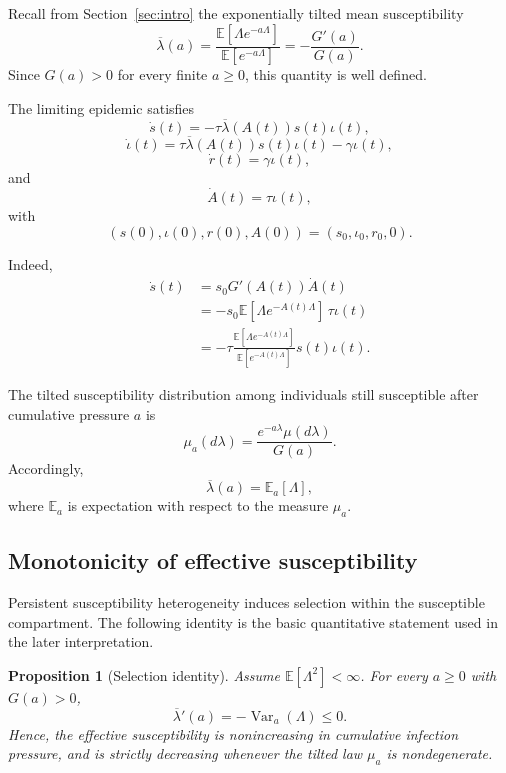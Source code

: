 \documentclass[pdflatex,sn-mathphys-ay]{sn-jnl}
\theoremstyle{thmstyleone}
\newtheorem{proposition}[theorem]{Proposition}
\theoremstyle{thmstyletwo}
\theoremstyle{thmstylethree}
\newcommand{\E}{\mathbb{E}}
\begin{document}
Recall from Section~\ref{sec:intro}  the exponentially tilted mean susceptibility
\[
\overline{\lambda}(a)
=
\frac{\E[\Lambda e^{-a\Lambda}]}
{\E[e^{-a\Lambda}]}
=
-\frac{G'(a)}{G(a)}.
\]
Since \(G(a)>0\) for every finite \(a\geq 0\), this quantity is well defined.

The limiting epidemic satisfies
\[
\dot s(t)
=
-\tau\overline{\lambda}(A(t))s(t)\iota(t),
\]
\[
\dot\iota(t)
=
\tau\overline{\lambda}(A(t))s(t)\iota(t)
-\gamma\iota(t),
\]
\[
\dot r(t)=\gamma\iota(t),
\]
and
\[
\dot A(t)=\tau\iota(t),
\]
with
\[
(s(0),\iota(0),r(0),A(0))
=
(s_0,\iota_0,r_0,0).
\]

Indeed,
\[
\begin{aligned}
\dot s(t)
&=
s_0G'(A(t))\dot A(t)\\
&=
-s_0\E[\Lambda e^{-A(t)\Lambda}]
\,\tau\iota(t)\\
&=
-\tau
\frac{\E[\Lambda e^{-A(t)\Lambda}]}
{\E[e^{-A(t)\Lambda}]}
s(t)\iota(t).
\end{aligned}
\]

The tilted susceptibility distribution among individuals still susceptible
after cumulative pressure \(a\) is
\begin{equation}\label{eq:mu_a}
\mu_a(d\lambda)
=
\frac{e^{-a\lambda}\mu(d\lambda)}{G(a)}.
\end{equation}
Accordingly,
\begin{equation}\label{eq:la_a}
\overline{\lambda}(a)=\E_a[\Lambda], 
\end{equation}
where $\E_a$ is expectation with respect to the measure $\mu_a$. 

\subsection{Monotonicity of effective susceptibility}\label{sec:effective}

Persistent susceptibility heterogeneity induces selection within the
susceptible compartment. The following identity is the basic quantitative
statement used in the later interpretation.

\begin{proposition}[Selection identity]\label{prop:selection}
Assume \(\E[\Lambda^2]<\infty\). For every \(a\geq0\) with \(G(a)>0\),
\[
\overline{\lambda}'(a)=-\operatorname{Var}_a(\Lambda)\leq0.
\]
Hence, the effective susceptibility is nonincreasing in cumulative infection
pressure, and is strictly decreasing whenever the tilted law \(\mu_a\) is
nondegenerate.
\end{proposition}
\end{document}
